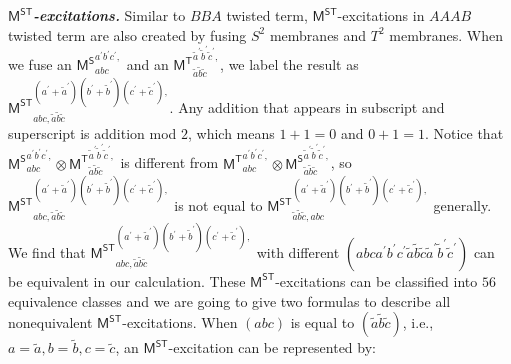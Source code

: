\documentclass[11pt,nofootinbib,preprint]{revtex4-1}
\begin{document}
\textbf{\textit{$\mathsf{M^{ST}}$-excitations.}}
Similar to $BBA$ twisted term, $\mathsf{M^{ST}}$-excitations in $AAAB$ twisted term are also created by fusing $S^2$ membranes and  $T^2$ membranes. When we fuse an $\mathsf{M^S}_{abc}^{a^{\prime}b^{\prime}c^{\prime},}$ and an $\mathsf{M^T}_{\tilde{a}\tilde{b}\tilde{c}}^{\tilde{a}^{\prime}\tilde{b}^{\prime}\tilde{c}^{\prime},}$, we label the result as $\mathsf{M^{ST}}_{abc,\tilde{a}\tilde{b}\tilde{c}}^{\left( a^{\prime}+\tilde{a}^{\prime} \right) \left( b^{\prime}+\tilde{b}^{\prime} \right) \left( c^{\prime}+\tilde{c}^{\prime} \right),}$. Any addition that appears in subscript and superscript is addition mod $2$, which means $1+1=0$ and $0+1=1$. Notice that $\mathsf{M^S}_{abc}^{a^{\prime}b^{\prime}c^{\prime},}\otimes\mathsf{M^T}_{\tilde{a}\tilde{b}\tilde{c}}^{\tilde{a}^{\prime}\tilde{b}^{\prime}\tilde{c}^{\prime},}$ is different from $\mathsf{M^T}_{abc}^{a^{\prime}b^{\prime}c^{\prime},}\otimes \mathsf{M^S}_{\tilde{a}\tilde{b}\tilde{c}}^{\tilde{a}^{\prime}\tilde{b}^{\prime}\tilde{c}^{\prime},}$, so $\mathsf{M^{ST}}_{abc,\tilde{a}\tilde{b}\tilde{c}}^{\left( a^{\prime}+\tilde{a}^{\prime} \right) \left( b^{\prime}+\tilde{b}^{\prime} \right) \left( c^{\prime}+\tilde{c}^{\prime} \right) ,}$ is not equal to $\mathsf{M^{ST}}_{\tilde{a}\tilde{b}\tilde{c},abc}^{\left( a^{\prime}+\tilde{a}^{\prime} \right) \left( b^{\prime}+\tilde{b}^{\prime} \right) \left( c^{\prime}+\tilde{c}^{\prime} \right),}$ generally. We find that $\mathsf{M^{ST}}_{abc,\tilde{a}\tilde{b}\tilde{c}}^{\left( a^{\prime}+\tilde{a}^{\prime} \right) \left( b^{\prime}+\tilde{b}^{\prime} \right) \left( c^{\prime}+\tilde{c}^{\prime} \right),}$ with different $\left(abca^{\prime}b^{\prime}c^{\prime}\tilde{a}\tilde{b}\tilde{c}\tilde{a}^{\prime}\tilde{b}^{\prime}\tilde{c}^{\prime}\right)$ can be equivalent in our calculation. These $\mathsf{M^{ST}}$-excitations can be classified into $56$ equivalence classes and we are going to give two formulas to describe all nonequivalent $\mathsf{M^{ST}}$-excitations. When $\left(abc\right)$ is equal to $\left(\tilde{a}\tilde{b}\tilde{c}\right)$, i.e., $a=\tilde{a},b=\tilde{b},c=\tilde{c}$, an $\mathsf{M^{ST}}$-excitation can be represented by:
\end{document}
